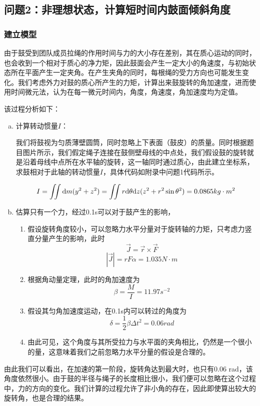 \documentclass[nocover]{cumcmart}%
\begin{document}
\subsection{问题2：非理想状态，计算短时间内鼓面倾斜角度}
\subsubsection{建立模型}
由于鼓受到团队成员拉绳的作用时间与力的大小存在差别，其在质心运动的同时，也会收到一个相对于质心的净力矩，因此鼓面会产生一定大小的角速度，与初始状态所在平面产生一定夹角。在产生夹角的同时，每根绳的受力方向也可能发生变化。我们考虑外力对鼓的质心所产生的力矩，计算出来鼓旋转的角加速度，进而使用时间微元法，认为在每一微元时间内，角度，角速度，角加速度均为定值。

该过程分析如下\cite{力学zkh}：

\begin{enumerate}[(a)]
    \item 
计算转动惯量$I$：

我们将鼓视为匀质薄壁圆筒，同时忽略上下表面（鼓皮）的质量。同时根据题目图片所示，我们假定绳子连接在鼓侧壁母线的中点处，我们假设鼓的旋转就是沿着母线中点所在水平轴的旋转，这一轴同时通过质心，由此建立坐标系，求鼓相对于此轴的转动惯量$I$，具体代码如附录中问题1代码所示。


$$I = \iint {\rm d}m(y^2 + z^2) = \iint  r{\rm d}\theta {\rm d}z (z^2 + r^2 \sin{\theta}^2) = 0.0865 kg\cdot m^2$$
\item 估算只有一个力，经过0.1s可以对于鼓产生的影响，
\begin{enumerate}[(1)]
    \item 假设旋转角度较小，可以忽略力水平分量对于旋转轴的力矩，只考虑力竖直分量产生的影响，此时
    $$\vec{J} = \vec{r}\times \vec{F}$$
    $$|\vec{J}| = rF\alpha = 1.035 N\cdot m$$
    \item 根据角动量定理，此时的角加速度为
    $$\beta = \frac{M}{I} = 11.97 s^{-2}$$
    \item 假设其匀角加速度运动，在0.1s内可以转过的角度为
    $$\delta = \frac{1}{2}\beta \Delta t^2 = 0.06 rad$$
    \item 由此可见，这个角度与其所受拉力与水平面的夹角相比，仍然是一个很小的量，这意味着我们之前忽略力水平分量的假设是合理的。
\end{enumerate}
\end{enumerate}

由此我们可以看出，在加速的第一阶段，旋转角达到最大时，也只有0.06 rad，该角度依然很小。由于鼓的半径与绳子的长度相比很小，我们便可以忽略在这个过程中，力的方向的变化。我们计算的过程允许了非小角的存在，因此即使算出较大的旋转角，也是合理的结果。
\end{document}
